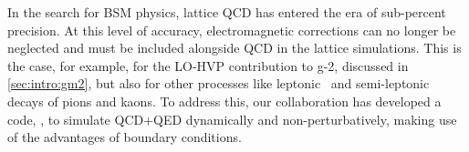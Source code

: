 


In the search for BSM physics, lattice QCD has entered the era of sub-percent precision.
At this level of accuracy, electromagnetic corrections can no longer be neglected and must be included alongside QCD in the lattice simulations.
This is the case, for example, for the LO-HVP contribution to g-2, discussed in \cref{sec:intro:gm2}, but also for other processes like leptonic~\cite{Boyle:2022lsi,PhysRevD.91.074506} and semi-leptonic~\cite{Tantalo:2013ty} decays of pions and kaons.
To address this, our collaboration has developed a code, \openqxd, to simulate QCD+QED dynamically and non-perturbatively, making use of the advantages of \Cstar boundary conditions.

